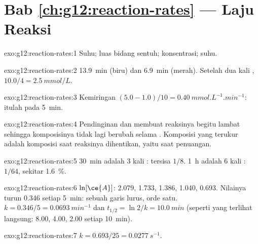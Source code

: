 \section*{Bab \ref{ch:g12:reaction-rates} --- Laju Reaksi}

\begin{solution}{exo:g12:reaction-rates:1}
Suhu; luas bidang sentuh; konsentrasi; suhu.
\end{solution}

\begin{solution}{exo:g12:reaction-rates:2}
\qty{13.9}{min} (biru) dan \qty{6.9}{min} (merah). Setelah dua kali , $10.0 / 4 = \qty{2.5}{mmol/L}$.
\end{solution}

\begin{solution}{exo:g12:reaction-rates:3}
Kemiringan $(5.0 - 1.0)/10 = \qty{0.40}{mmol.L^{-1}.min^{-1}}$: itulah
 pada \qty{5}{min}.
\end{solution}

\begin{solution}{exo:g12:reaction-rates:4}
Pendinginan dan  membuat reaksinya begitu lambat sehingga
komposisinya tidak lagi berubah selama . Komposisi yang terukur
adalah komposisi  saat reaksinya dihentikan, yaitu saat
penuangan.
\end{solution}

\begin{solution}{exo:g12:reaction-rates:5}
\qty{30}{min} adalah 3 kali : tersisa $1/8$. \qty{1}{h}
adalah 6 kali : $1/64$, sekitar \qty{1.6}{\percent}.
\end{solution}

\begin{solution}{exo:g12:reaction-rates:6}
$\ln[\ce{A}]$: 2.079, 1.733, 1.386, 1.040, 0.693. Nilainya turun 0.346
setiap \qty{5}{min}: sebuah garis lurus, orde satu. $k = 0.346/5 =
\qty{0.0693}{min^{-1}}$ dan $t_{1/2} = \ln 2 / k = \qty{10.0}{min}$
(seperti yang terlihat langsung: 8.00, 4.00, 2.00 setiap
\qty{10}{min}).
\end{solution}

\begin{solution}{exo:g12:reaction-rates:7}
$k = 0.693 / 25 = \qty{0.0277}{s^{-1}}$.
\end{solution}

